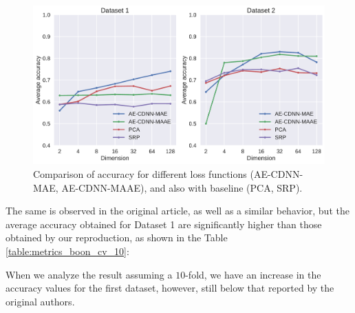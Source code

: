 \begin{figure}[!ht]
\centering
\includegraphics[width=\linewidth]{figure/baseline_methods.pdf}
  \caption{Comparison of accuracy for different loss functions (AE-CDNN-MAE, AE-CDNN-MAAE), and also with baseline (PCA, SRP).}
\label{fig:baseline_methods}
\end{figure}

The same is observed in the original article, as well as a similar behavior, but the average accuracy obtained for Dataset 1 are significantly higher than those obtained by our reproduction, as shown in the Table \ref{table:metrics_boon_cv_10}:



When we analyze the result assuming a $10$-fold, we have an increase in the accuracy values for the first dataset, however, still below that reported by the original authors.

